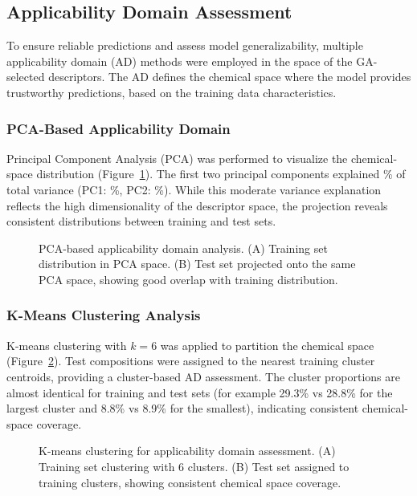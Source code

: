 \subsection{Applicability Domain Assessment}

To ensure reliable predictions and assess model generalizability, multiple applicability
domain (AD) methods were employed in the space of the \GAFinalN{} GA-selected descriptors. The
AD defines the chemical space where the model provides trustworthy predictions, based on the
training data characteristics.

\subsubsection{PCA-Based Applicability Domain}
Principal Component Analysis (PCA) was performed to visualize the chemical-space distribution
(Figure~\ref{fig:adpca}). The first two principal components explained \ADPCAVar{}\% of total
variance (PC1: \ADPCone{}\%, PC2: \ADPCtwo{}\%). While this moderate variance explanation
reflects the high dimensionality of the descriptor space, the projection reveals consistent
distributions between training and test sets.

\begin{figure}[H]
  \centering
  \caption{PCA-based applicability domain analysis. (A) Training set distribution in PCA
  space. (B) Test set projected onto the same PCA space, showing good overlap with training
  distribution.}\label{fig:adpca}
\end{figure}

\subsubsection{K-Means Clustering Analysis}
K-means clustering with $k=6$ was applied to partition the chemical space
(Figure~\ref{fig:adkm}). Test compositions were assigned to the nearest training cluster
centroids, providing a cluster-based AD assessment. The cluster proportions are almost
identical for training and test sets (for example 29.3\% vs 28.8\% for the largest cluster
and 8.8\% vs 8.9\% for the smallest), indicating consistent chemical-space coverage.

\begin{figure}[H]
  \centering
  \caption{K-means clustering for applicability domain assessment. (A) Training set
  clustering with 6 clusters. (B) Test set assigned to training clusters, showing consistent
  chemical space coverage.}\label{fig:adkm}
\end{figure}

